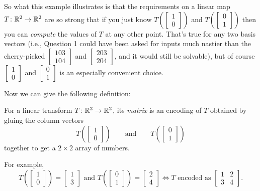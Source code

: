 So what this example illustrates is that the requirements on a linear map
$T \colon \mathbb R^2 \to \mathbb R^2$ are so strong that if you just know
$T\left( \left[ \begin{smallmatrix} 1 \\ 0 \end{smallmatrix} \right] \right)$
and $T\left( \left[ \begin{smallmatrix} 0 \\ 1 \end{smallmatrix} \right] \right)$
then you can \emph{compute} the values of $T$ at any other point.
That's true for any two basis vectors
(i.e., Question 1 could have been asked for inputs much
nastier than the cherry-picked
$\left[ \begin{smallmatrix} 103 \\ 104 \end{smallmatrix} \right]$
and $\left[ \begin{smallmatrix} 203 \\ 204 \end{smallmatrix} \right]$,
and it would still be solvable),
but of course
$\left[ \begin{smallmatrix} 1 \\ 0 \end{smallmatrix} \right]$
and $\left[ \begin{smallmatrix} 0 \\ 1 \end{smallmatrix} \right]$
is an especially convenient choice.

Now we can give the following definition:
\begin{definition}
	For a linear transform $T \colon \mathbb R^2 \to \mathbb R^2$,
	its \emph{matrix} is an encoding of $T$
	obtained by gluing the column vectors
	\[
		T\left( \begin{bmatrix} 1 \\ 0 \end{bmatrix} \right)
		\qquad\text{and}\qquad
		T\left( \begin{bmatrix} 0 \\ 1 \end{bmatrix} \right)
	\]
	together to get a $2 \times 2$ array of numbers.
\end{definition}

For example,
\[
	T\left( \begin{bmatrix} 1 \\ 0 \end{bmatrix} \right) = \begin{bmatrix} 1 \\ 3 \end{bmatrix}
	\text{ and }
	T\left( \begin{bmatrix} 0 \\ 1  \end{bmatrix} \right) = \begin{bmatrix} 2 \\ 4 \end{bmatrix}
	\iff
	T \text{ encoded as }
	\begin{bmatrix} 1 & 2 \\ 3 & 4 \end{bmatrix}.
\]


